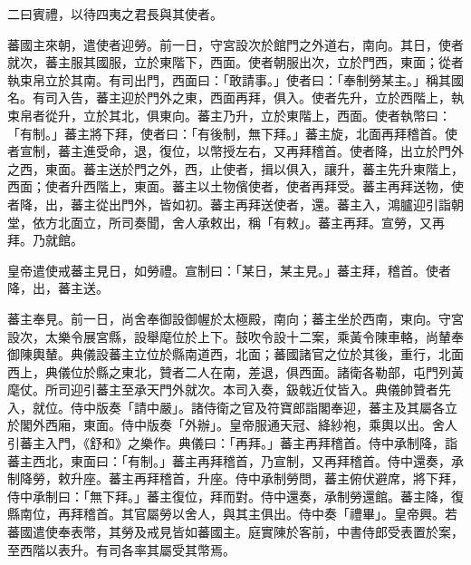 
\begin{pinyinscope}

 二曰賓禮，以待四夷之君長與其使者。



 蕃國主來朝，遣使者迎勞。前一日，守宮設次於館門之外道右，南向。其日，使者就次，蕃主服其國服，立於東階下，西面。使者朝服出次，立於門西，東面；從者執束帛立於其南。有司出門，西面曰：「敢請事。」使者曰：「奉制勞某主。」稱其國名。有司入告，蕃主迎於門外之東，西面再拜，俱入。使者先升，立於西階上，執束帛者從升，立於其北，俱東向。蕃主乃升，立於東階上，西面。使者執幣曰：「有制。」蕃主將下拜，使者曰：「有後制，無下拜。」蕃主旋，北面再拜稽首。使者宣制，蕃主進受命，退，復位，以幣授左右，又再拜稽首。使者降，出立於門外之西，東面。蕃主送於門之外，西，止使者，揖以俱入，讓升，蕃主先升東階上，西面；使者升西階上，東面。蕃主以土物儐使者，使者再拜受。蕃主再拜送物，使者降，出，蕃主從出門外，皆如初。蕃主再拜送使者，還。蕃主入，鴻臚迎引詣朝堂，依方北面立，所司奏聞，舍人承敕出，稱「有敕」。蕃主再拜。宣勞，又再拜。乃就館。



 皇帝遣使戒蕃主見日，如勞禮。宣制曰：「某日，某主見。」蕃主拜，稽首。使者降，出，蕃主送。



 蕃主奉見。前一日，尚舍奉御設御幄於太極殿，南向；蕃主坐於西南，東向。守宮設次，太樂令展宮縣，設舉麾位於上下。鼓吹令設十二案，乘黃令陳車輅，尚輦奉御陳輿輦。典儀設蕃主立位於縣南道西，北面；蕃國諸官之位於其後，重行，北面西上，典儀位於縣之東北，贊者二人在南，差退，俱西面。諸衛各勒部，屯門列黃麾仗。所司迎引蕃主至承天門外就次。本司入奏，鈒戟近仗皆入。典儀帥贊者先入，就位。侍中版奏「請中嚴」。諸侍衛之官及符寶郎詣閣奉迎，蕃主及其屬各立於閣外西廂，東面。侍中版奏「外辦」。皇帝服通天冠、絳紗袍，乘輿以出。舍人引蕃主入門，《舒和》之樂作。典儀曰：「再拜。」蕃主再拜稽首。侍中承制降，詣蕃主西北，東面曰：「有制。」蕃主再拜稽首，乃宣制，又再拜稽首。侍中還奏，承制降勞，敕升座。蕃主再拜稽首，升座。侍中承制勞問，蕃主俯伏避席，將下拜，侍中承制曰：「無下拜。」蕃主復位，拜而對。侍中還奏，承制勞還館。蕃主降，復縣南位，再拜稽首。其官屬勞以舍人，與其主俱出。侍中奏「禮畢」。皇帝興。若蕃國遣使奉表幣，其勞及戒見皆如蕃國主。庭實陳於客前，中書侍郎受表置於案，至西階以表升。有司各率其屬受其幣焉。




\end{pinyinscope}
